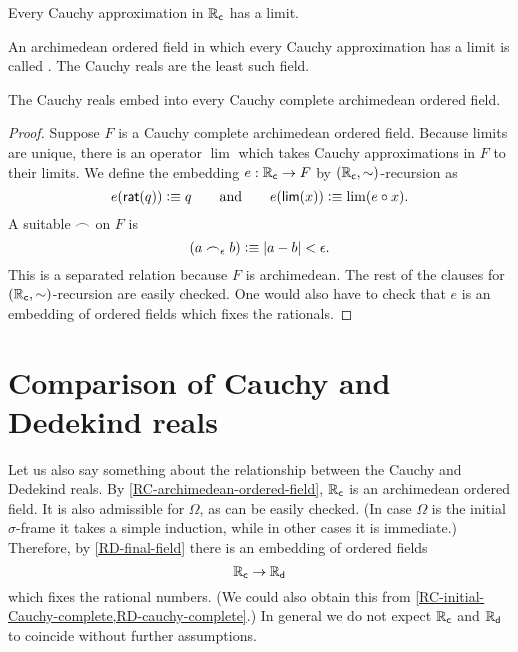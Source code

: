 \begin{thm}
  Every Cauchy approximation in $\mathbb{R}_\mathsf{c}$ has a limit.
\end{thm}

An archimedean ordered field in which every Cauchy approximation has a limit is called
.
The Cauchy reals are the least such field.

\begin{thm} \label{RC-initial-Cauchy-complete}
  The Cauchy reals embed into every Cauchy complete archimedean ordered field.
\end{thm}

\begin{proof}
  Suppose $F$ is a Cauchy complete archimedean ordered field. Because limits are unique,
  there is an operator $\lim$ which takes Cauchy approximations in $F$ to their limits. We
  define the embedding $e : \mathbb{R}_\mathsf{c} \to F$ by $(\mathbb{R}_\mathsf{c}, {\mathord\sim})$-recursion as
  \begin{equation*}
    e(\mathsf{rat}(q)) \vcentcolon\equiv q
    \qquad\text{and}\qquad
    e(\mathsf{lim}(x)) \vcentcolon\equiv \lim (e \circ x).
  \end{equation*}
  A suitable $\frown$ on $F$ is
  \begin{equation*}
    (a \frown_\epsilon b) \vcentcolon\equiv |a - b| < \epsilon.
  \end{equation*}
  This is a separated relation because $F$ is archimedean. The rest of the clauses for
  $(\mathbb{R}_\mathsf{c}, {\mathord\sim})$-recursion are easily checked. One would also have to check that $e$ is
  an embedding of ordered fields which fixes the rationals.
\end{proof}


\section{Comparison of Cauchy and Dedekind reals}
\label{sec:comp-cauchy-dedek}


Let us also say something about the relationship between the Cauchy and Dedekind reals. By
\autoref{RC-archimedean-ordered-field}, $\mathbb{R}_\mathsf{c}$ is an archimedean ordered field. It is also
admissible for $\Omega$, as can be easily checked. (In case $\Omega$ is the initial
$\sigma$-frame
it takes a simple induction, while in other cases it is immediate.)
Therefore, by \autoref{RD-final-field} there is an embedding of ordered fields
%
\begin{equation*}
  \mathbb{R}_\mathsf{c} \to \mathbb{R}_\mathsf{d}
\end{equation*}
%
which fixes the rational numbers.
(We could also obtain this from \autoref{RC-initial-Cauchy-complete,RD-cauchy-complete}.)
In general we do not expect $\mathbb{R}_\mathsf{c}$ and $\mathbb{R}_\mathsf{d}$ to coincide
without further assumptions. 

